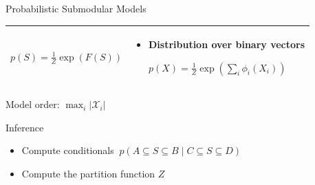 \documentclass[mathserif]{beamer}
\newcommand{\qboxa}[1]{%
\begin{tcolorbox}[enhanced jigsaw,size=tight,hbox,boxsep=4pt,boxrule=1pt,coltext=textcolor,colframe=col1,opacityback=0,opacityframe=1]
\strut #1
\end{tcolorbox}%
}
\begin{document}
\begin{frame}{Probabilistic Submodular Models}
\begin{tabular}{>{\arraybackslash}p{}>{\arraybackslash}p{}}
\begin{minipage}[t]{\textwidth}
\begin{itemize}
\vspace{1em}
$p(S) = \displaystyle\frac{1}{Z} \exp(F(S))$
\end{itemize}
\end{minipage}
&
\begin{minipage}[t]{\textwidth}
\begin{itemize}
\item Distribution over binary vectors

\vspace{0.3em}
$p(X) = \displaystyle\frac{1}{Z} \exp\left(\sum_i \phi_i(X_i)\right)$
\end{itemize}

\vspace{0.5em}
\end{minipage}\\ \midrule
\end{tabular}

\vspace{0.2em}
\centering
\qboxa{Model order: $\max_i |\mathcal{X}_i|$}
\end{frame}



\begin{frame}{Inference}
\begin{itemize}
\item Compute conditionals $\ p(A \subseteq S \subseteq B \mid C \subseteq S \subseteq D)$
\vspace{1em}
\item Compute the partition function $Z$
\end{itemize}
\end{frame}
\end{document}
